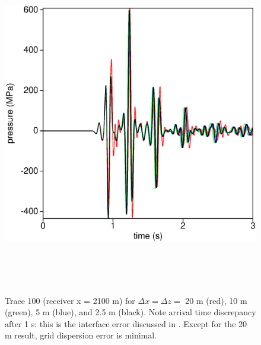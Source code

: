 \begin{figure}
\includegraphics[height=15cm,width=15cm]{./Fig/fig4.ps}
\caption{Trace 100 (receiver x = 2100 m) for $\Delta x = \Delta z = $
  20 m (red), 10 m (green), 5 m (blue), and 2.5 m (black). Note
  arrival time discrepancy after 1 s: this is the interface error
  discussed in \cite{SymesVdovina:09}. Except for the 20 m result,
  grid dispersion error is minimal.} 
\label{fig:trace}
\end{figure}


